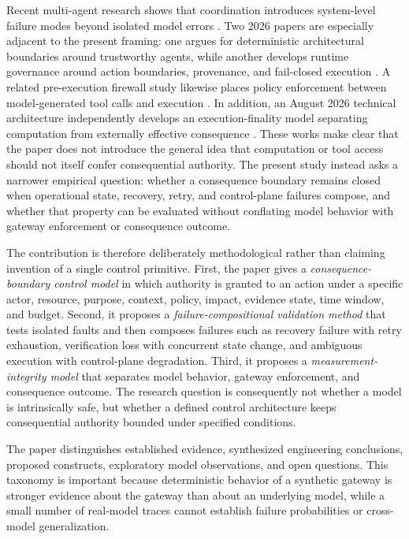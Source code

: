 \documentclass[conference]{IEEEtran}
\begin{document}
Recent multi-agent research shows that coordination introduces system-level failure modes beyond isolated model errors \cite{r13,r14}. Two 2026 papers are especially adjacent to the present framing: one argues for deterministic architectural boundaries around trustworthy agents, while another develops runtime governance around action boundaries, provenance, and fail-closed execution \cite{r15,r16}. A related pre-execution firewall study likewise places policy enforcement between model-generated tool calls and execution \cite{r17}. In addition, an August 2026 technical architecture independently develops an execution-finality model separating computation from externally effective consequence \cite{r18}. These works make clear that the paper does not introduce the general idea that computation or tool access should not itself confer consequential authority. The present study instead asks a narrower empirical question: whether a consequence boundary remains closed when operational state, recovery, retry, and control-plane failures compose, and whether that property can be evaluated without conflating model behavior with gateway enforcement or consequence outcome.

The contribution is therefore deliberately methodological rather than claiming invention of a single control primitive. First, the paper gives a \emph{consequence-boundary control model} in which authority is granted to an action under a specific actor, resource, purpose, context, policy, impact, evidence state, time window, and budget. Second, it proposes a \emph{failure-compositional validation method} that tests isolated faults and then composes failures such as recovery failure with retry exhaustion, verification loss with concurrent state change, and ambiguous execution with control-plane degradation. Third, it proposes a \emph{measurement-integrity model} that separates model behavior, gateway enforcement, and consequence outcome. The research question is consequently not whether a model is intrinsically safe, but whether a defined control architecture keeps consequential authority bounded under specified conditions.

The paper distinguishes established evidence, synthesized engineering conclusions, proposed constructs, exploratory model observations, and open questions. This taxonomy is important because deterministic behavior of a synthetic gateway is stronger evidence about the gateway than about an underlying model, while a small number of real-model traces cannot establish failure probabilities or cross-model generalization.
\end{document}
